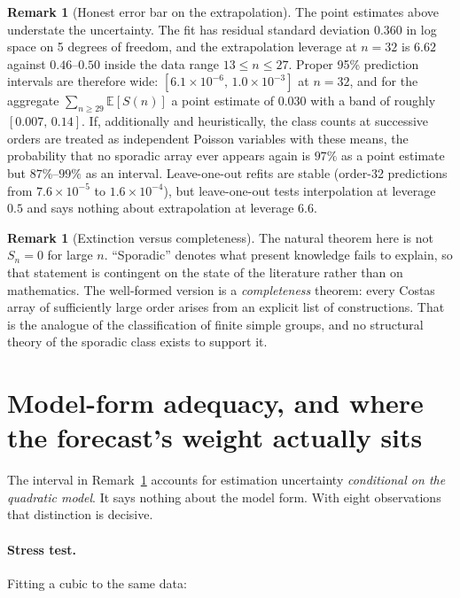 \documentclass[11pt,a4paper,oneside]{report}
\theoremstyle{definition}
\newtheorem{remark}[theorem]{Remark}
\begin{document}
\begin{remark}[Honest error bar on the extrapolation]
\label{p6-rem:errorbar}
The point estimates above understate the uncertainty. The fit has residual
standard deviation $0.360$ in log space on 5 degrees of freedom, and the
extrapolation leverage at $n=32$ is $6.62$ against $0.46$--$0.50$ inside the data
range $13\le n\le27$. Proper 95\% prediction intervals are therefore wide:
$[6.1\times10^{-6},\,1.0\times10^{-3}]$ at $n=32$, and for the aggregate
$\sum_{n\ge29}\mathbb E[S(n)]$ a point estimate of $0.030$ with a band of roughly
$[0.007,\,0.14]$. If, additionally and heuristically, the class counts at successive orders are treated as
independent Poisson variables with these means, the probability that no sporadic array ever
appears again is $97\%$ as a point estimate but $87\%$--$99\%$ as an interval. Leave-one-out refits are stable (order-32 predictions from
$7.6\times10^{-5}$ to $1.6\times10^{-4}$), but leave-one-out tests interpolation
at leverage $0.5$ and says nothing about extrapolation at leverage $6.6$.
\end{remark}

\begin{remark}[Extinction versus completeness]
The natural theorem here is not $S_n=0$ for large $n$. ``Sporadic'' denotes what
present knowledge fails to explain, so that statement is contingent on the state
of the literature rather than on mathematics. The well-formed version is a
\emph{completeness} theorem: every Costas array of sufficiently large order
arises from an explicit list of constructions. That is the analogue of the
classification of finite simple groups, and no structural theory of the sporadic
class exists to support it.
\end{remark}

\section{Model-form adequacy, and where the forecast's weight actually sits}
\label{p6-sec:adequacy}

The interval in Remark~\ref{p6-rem:errorbar} accounts for estimation uncertainty
\emph{conditional on the quadratic model}. It says nothing about the model form.
With eight observations that distinction is decisive.

\paragraph{Stress test.} Fitting a cubic to the same data:
\end{document}
